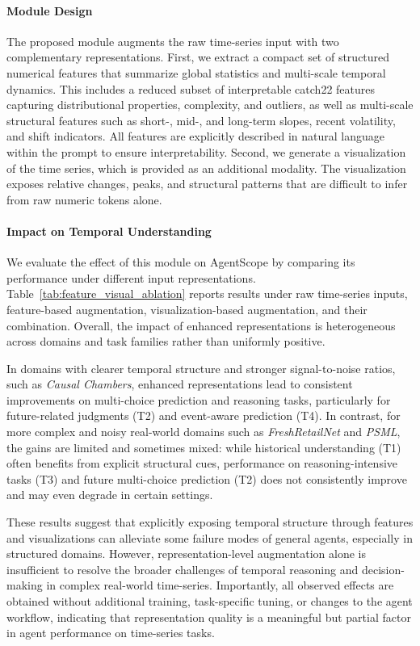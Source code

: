 \paragraph{Module Design}
The proposed module augments the raw time-series input with two complementary representations. First, we extract a compact set of structured numerical features that summarize global statistics and multi-scale temporal dynamics. This includes a reduced subset of interpretable catch22 features~\cite{lubba2019catch22} capturing distributional properties, complexity, and outliers, as well as multi-scale structural features such as short-, mid-, and long-term slopes, recent volatility, and shift indicators. All features are explicitly described in natural language within the prompt to ensure interpretability. Second, we generate a visualization of the time series, which is provided as an additional modality. The visualization exposes relative changes, peaks, and structural patterns that are difficult to infer from raw numeric tokens alone.

\paragraph{Impact on Temporal Understanding}
We evaluate the effect of this module on AgentScope by comparing its performance under different input representations.
Table~\ref{tab:feature_visual_ablation} reports results under raw time-series inputs, feature-based augmentation, visualization-based augmentation, and their combination.
Overall, the impact of enhanced representations is heterogeneous across domains and task families rather than uniformly positive.

In domains with clearer temporal structure and stronger signal-to-noise ratios, such as \emph{Causal Chambers}, enhanced representations lead to consistent improvements on multi-choice prediction and reasoning tasks, particularly for future-related judgments (T2) and event-aware prediction (T4).
In contrast, for more complex and noisy real-world domains such as \emph{FreshRetailNet} and \emph{PSML}, the gains are limited and sometimes mixed: while historical understanding (T1) often benefits from explicit structural cues, performance on reasoning-intensive tasks (T3) and future multi-choice prediction (T2) does not consistently improve and may even degrade in certain settings.

These results suggest that explicitly exposing temporal structure through features and visualizations can alleviate some failure modes of general agents, especially in structured domains.
However, representation-level augmentation alone is insufficient to resolve the broader challenges of temporal reasoning and decision-making in complex real-world time-series.
Importantly, all observed effects are obtained without additional training, task-specific tuning, or changes to the agent workflow, indicating that representation quality is a meaningful but partial factor in agent performance on time-series tasks.


